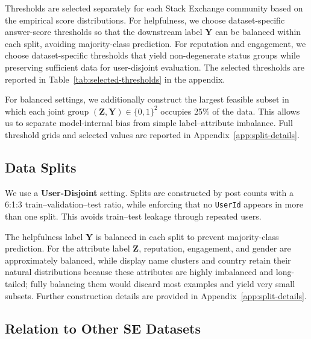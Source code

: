 \documentclass[11pt]{article}
\newcommand{\rv}[1]{\mathbf{#1}}
\begin{document}
Thresholds are selected separately for each Stack Exchange community based on the empirical score distributions. For helpfulness, we choose dataset-specific answer-score thresholds so that the downstream label $\rv{Y}$ can be balanced within each split, avoiding majority-class prediction. For reputation and engagement, we choose dataset-specific thresholds that yield non-degenerate status groups while preserving sufficient data for user-disjoint evaluation. The selected thresholds are reported in Table~\ref{tab:selected-thresholds} in the appendix.

For balanced settings, we additionally construct the largest feasible subset in which each joint group $(\rv{Z},\rv{Y}) \in \{0,1\}^2$ occupies 25\% of the data. This allows us to separate model-internal bias from simple label--attribute imbalance. Full threshold grids and selected values are reported in Appendix~\ref{app:split-details}.















\subsection{Data Splits}
\label{sec:splits}

We use a \textbf{User-Disjoint} setting. Splits are constructed by post counts with a 6:1:3 train--validation--test ratio, while enforcing that no \texttt{UserId} appears in more than one split. This avoids train--test leakage through repeated users.

The helpfulness label $\rv{Y}$ is balanced in each split to prevent majority-class prediction. For the attribute label $\rv{Z}$, reputation, engagement, and gender are approximately balanced, while display name clusters and country retain their natural distributions because these attributes are highly imbalanced and long-tailed; fully balancing them would discard most examples and yield very small subsets. Further construction details are provided in Appendix~\ref{app:split-details}.



\subsection{Relation to Other SE Datasets}
\label{sec:relation_to_other_SE_dataset}
\end{document}
